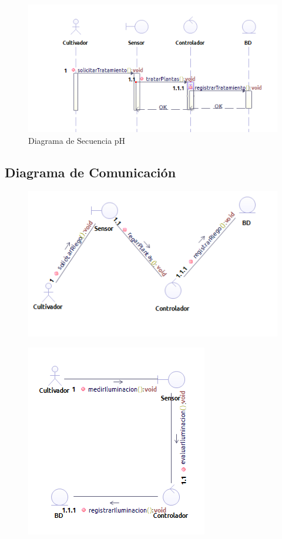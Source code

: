\begin{table}[]
\begin{figure}[h!]
	\centering
	\includegraphics[width=1.0\linewidth]{proyecto/imgs/SecuenciaTierra}
	\caption{Diagrama de Secuencia pH}
	\label{fig:secuenciatierra}
\end{figure}

\newpage

\subsection{Diagrama de Comunicación}

\begin{figure}
	\centering
	\includegraphics[width=0.8\linewidth]{proyecto/imgs/comunicacionRiego}
	\caption{}
	\label{fig:comunicacionriego}
\end{figure}


\begin{figure}
	\centering
	\includegraphics[width=0.6\linewidth]{proyecto/imgs/comunicacionIluminacion}
	\caption{}
	\label{fig:comunicacioniluminacion}
\end{figure}


\end{table}
